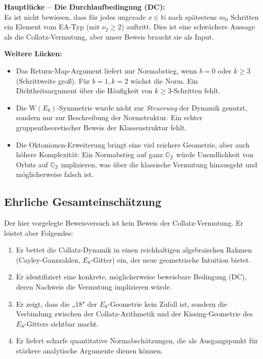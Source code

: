 \documentclass[12pt,a4paper]{article}
\newcommand{\vii}{\nu_2}           %
\newcommand{\OZ}{\mathbb{O}_{\mathbb{Z}}}  %
\newcommand{\WE}{\mathrm{W}(E_8)}  %
\newcommand{\N}{\mathbb{N}}
\begin{document}
\begin{tcolorbox}[lücke]
\textbf{Hauptlücke – Die Durchlaufbedingung (DC):}\\
Es ist nicht bewiesen, dass für jedes ungerade $x \in \N$
nach spätestens $m_0$ Schritten ein Element vom EA-Typ (mit $\vii \geq 2$)
auftritt. Dies ist eine schwächere Aussage als die Collatz-Vermutung,
aber unser Beweis braucht sie als Input.

\textbf{Weitere Lücken:}
\begin{itemize}
  \item Das Return-Map-Argument liefert nur Normabstieg, wenn $b=0$
    oder $k \geq 3$ (Schrittweite groß). Für $b=1, k=2$ wächst die Norm.
    Ein Dichtheitsargument über die Häufigkeit von $k \geq 3$-Schritten fehlt.
  \item Die $\WE$-Symmetrie wurde nicht zur \emph{Steuerung} der Dynamik
    genutzt, sondern nur zur Beschreibung der Normstruktur.
    Ein echter gruppentheoretischer Beweis der Klassenstruktur fehlt.
  \item Die Oktonionen-Erweiterung bringt eine viel reichere Geometrie,
    aber auch höhere Komplexität: Ein Normabstieg auf ganz $\OZ$ würde
    Unendlichkeit von Orbits auf $\OZ$ implizieren, was über die
    klassische Vermutung hinausgeht und möglicherweise falsch ist.
\end{itemize}
\end{tcolorbox}

\subsection{Ehrliche Gesamteinschätzung}

Der hier vorgelegte Beweisversuch ist kein Beweis der Collatz-Vermutung.
Er leistet aber Folgendes:

\begin{enumerate}[label=(\arabic*)]
  \item Er bettet die Collatz-Dynamik in einen reichhaltigen algebraischen
    Rahmen (Cayley-Ganzzahlen, $E_8$-Gitter) ein, der neue geometrische
    Intuition bietet.
  \item Er identifiziert eine konkrete, möglicherweise beweisbare
    Bedingung (DC), deren Nachweis die Vermutung implizieren würde.
  \item Er zeigt, dass die „18" der $E_8$-Geometrie kein Zufall ist,
    sondern die Verbindung zwischen der Collatz-Arithmetik und der
    Kissing-Geometrie des $E_8$-Gitters sichtbar macht.
  \item Er liefert scharfe quantitative Normabschätzungen, die als
    Ausgangspunkt für stärkere analytische Argumente dienen können.
\end{enumerate}
\end{document}
